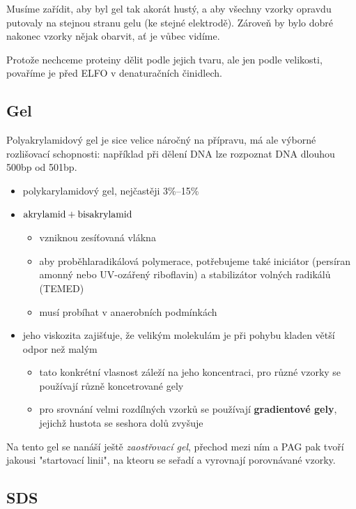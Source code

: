 \documentclass[DIV=8]{scrreprt}
\begin{document}
Musíme zařídit, aby byl gel tak akorát hustý, a aby všechny vzorky opravdu putovaly na stejnou stranu gelu (ke stejné elektrodě). Zároveň by bylo dobré nakonec vzorky nějak obarvit, ať je vůbec vidíme.

Protože nechceme proteiny dělit podle jejich tvaru, ale jen podle velikosti, povaříme je před ELFO v denaturačních činidlech.

\subsection{Gel} \label{Gel}


Polyakrylamidový gel je sice velice náročný na přípravu, má ale výborné rozlišovací schopnosti: například při dělení DNA lze rozpoznat DNA dlouhou 500bp od 501bp.

\begin{itemize}[nosep]
    \item polykarylamidový gel, nejčastěji 3\%--15\%
    \item \(\ce{akrylamid + bisakrylamid}\)
\begin{itemize}[nosep]
    \item vzniknou zesíťovaná vlákna
    \item aby proběhlaradikálová polymerace, potřebujeme také iniciátor (persíran amonný nebo UV-ozářený riboflavin) a stabilizátor volných radikálů (TEMED)
    \item musí probíhat v anaerobních podmínkách
\end{itemize}

    \item jeho viskozita zajišťuje, že velikým molekulám je při pohybu kladen větší odpor než malým
\begin{itemize}[nosep]
    \item tato konkrétní vlasnost záleží na jeho koncentraci, pro různé vzorky se používají různě koncetrované gely
    \item pro srovnání velmi rozdílných vzorků se používají \textbf{gradientové gely}, jejichž hustota se seshora dolů zvyšuje
\end{itemize}

\end{itemize}



Na tento gel se nanáší ještě \emph{zaostřovací gel}, přechod mezi ním a PAG pak tvoří jakousi "startovací linii", na kteoru se seřadí a vyrovnají porovnávané vzorky.

\subsection{SDS} \label{SDS}
\end{document}
